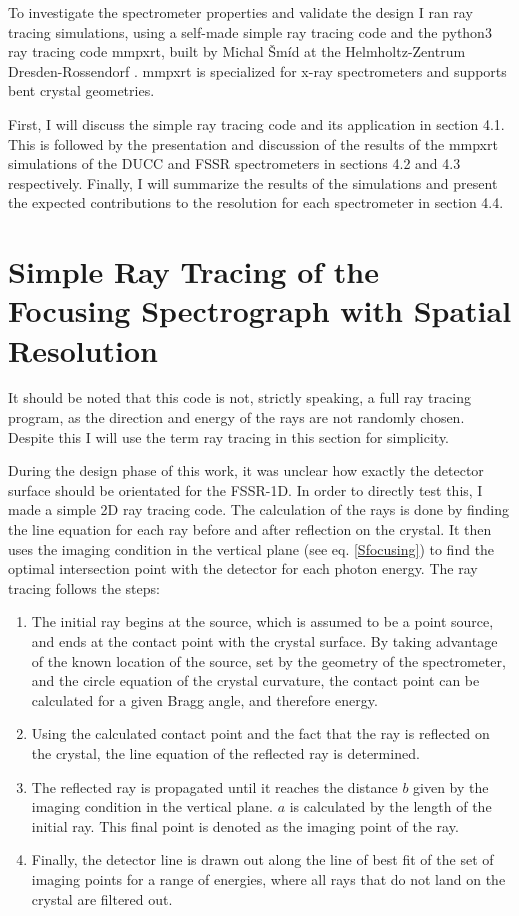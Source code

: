 To investigate the spectrometer properties and 
validate the design I ran ray tracing 
simulations, using a self-made simple ray tracing 
code and the 
python3 ray 
tracing code mmpxrt, built by Michal 
\v{S}m\'{i}d at the Helmholtz-Zentrum 
Dresden-Rossendorf \citep{vsmid2021x}. mmpxrt is 
specialized for 
x-ray spectrometers and supports bent crystal 
geometries. 

First, I will discuss the simple ray tracing 
code and its application in section 
4.1. This is followed by the presentation and discussion of the 
results of the 
mmpxrt simulations of the DUCC and FSSR spectrometers in 
sections 4.2 and 4.3 
respectively. Finally, I will summarize the results of the 
simulations and 
present the expected contributions to the resolution for each 
spectrometer in 
section 4.4.

\section{Simple Ray Tracing of the Focusing 
Spectrograph with Spatial Resolution}
It should be noted that this code is not, strictly 
speaking, a full ray tracing program, as the 
direction and 
energy of the rays are not randomly chosen. Despite 
this I will use the term ray tracing in this section 
for simplicity.

During the design phase of this work, it was unclear how exactly 
the detector 
surface should be orientated for the FSSR-1D. In 
order to directly 
test this, I made a simple 2D ray tracing code. The 
calculation of 
the rays is 
done by finding the line equation for each ray before and after 
reflection on 
the crystal. It then uses the imaging condition in the vertical 
plane (see eq.
\ref{Sfocusing}) to find the optimal intersection point with the 
detector for 
each photon energy. The ray tracing follows the steps:
\begin{enumerate}
	\item The initial ray begins at the source, which is assumed 
	to be a point 
	source, and ends at the contact point with the crystal 
	surface. By taking 
	advantage of the known location of the source, set by the 
	geometry of the 
	spectrometer, and the circle equation of the crystal 
	curvature, the contact 
	point can be calculated for a given Bragg angle, 
	and 
	therefore energy.
	\item Using the calculated contact point and the fact that 
	the ray is 
	reflected on the crystal, the line equation of the reflected 
	ray is 
	determined. 
	\item The reflected ray is propagated until it reaches the 
	distance $b$ 
	given by the imaging condition in the vertical plane. $a$ is 
	calculated by 
	the length of the initial ray. This final point is denoted 
	as the imaging 
	point of the ray.
	\item Finally, the detector line is drawn out along the line 
	of best fit of 
	the set of imaging points for a range of energies, where all 
	rays that do 
	not land on the crystal are filtered out. 
\end{enumerate}

